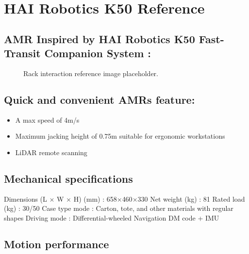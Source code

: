 \chapter{HAI Robotics K50 Reference}

\section*{AMR Inspired by HAI Robotics K50 Fast-Transit Companion System :}

\begin{figure}[H]
\centering
{}
\caption{Rack interaction reference image placeholder.}
\end{figure}

\section*{Quick and convenient AMRs feature:}

\begin{itemize}
    \item A max speed of 4m/s
\end{itemize}

\begin{itemize}
    \item Maximum jacking height of 0.75m suitable for ergonomic workstations
\end{itemize}

\begin{itemize}
    \item LiDAR remote scanning
\end{itemize}

\section*{Mechanical specifications}

Dimensions (L $\times$ W $\times$ H) (mm) : 658$\times$460$\times$330 Net weight (kg) : 81 Rated load (kg) : 30/50 Case type mode : Carton, tote, and other materials with regular shapes Driving mode : Differential-wheeled Navigation DM code + IMU

\section*{Motion performance}

